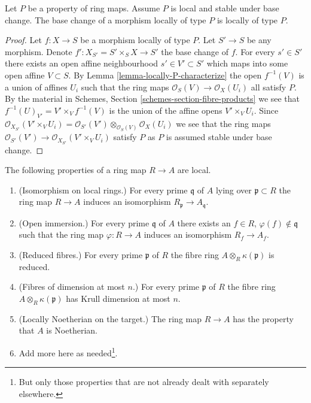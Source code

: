 \begin{lemma}
\label{lemma-base-change-type-P}
Let $P$ be a property of ring maps.
Assume $P$ is local and stable under base change.
The base change of a morphism locally of type $P$
is locally of type $P$.
\end{lemma}

\begin{proof}
Let $f : X \to S$ be a morphism locally of type $P$.
Let $S' \to S$ be any morphism. Denote
$f' : X_{S'} = S' \times_S X \to S'$ the base change of $f$.
For every $s' \in S'$ there exists an open affine neighbourhood
$s' \in V' \subset S'$ which maps into some open affine $V \subset S$.
By Lemma \ref{lemma-locally-P-characterize} the open $f^{-1}(V)$ is a
union of affines $U_i$ such that the ring maps
$\mathcal{O}_S(V) \to \mathcal{O}_X(U_i)$ all satisfy $P$.
By the material in Schemes, Section \ref{schemes-section-fibre-products}
we see that $f^{-1}(U)_{V'} = V' \times_V f^{-1}(V)$ is
the union of the affine opens $V' \times_V U_i$.
Since $\mathcal{O}_{X_{S'}}(V' \times_V U_i) =
\mathcal{O}_{S'}(V') \otimes_{\mathcal{O}_S(V)} \mathcal{O}_X(U_i)$
we see that the ring maps
$\mathcal{O}_{S'}(V') \to \mathcal{O}_{X_{S'}}(V' \times_V U_i)$
satisfy $P$ as $P$ is assumed stable under base change.
\end{proof}

\begin{lemma}
\label{lemma-properties-local}
The following properties of a ring map $R \to A$ are local.
\begin{enumerate}
\item (Isomorphism on local rings.)
For every prime $\mathfrak q$ of $A$ lying over $\mathfrak p \subset R$
the ring map $R \to A$ induces an isomorphism
$R_{\mathfrak p} \to A_{\mathfrak q}$.
\item (Open immersion.)
For every prime $\mathfrak q$ of $A$ there exists an $f \in R$,
$\varphi(f) \not \in \mathfrak q$ such that the ring map $\varphi : R \to A$
induces an isomorphism $R_f \to A_f$.
\item (Reduced fibres.)
For every prime $\mathfrak p$ of $R$ the fibre ring
$A \otimes_R \kappa(\mathfrak p)$ is reduced.
\item (Fibres of dimension at most $n$.)
For every prime $\mathfrak p$ of $R$ the fibre ring
$A \otimes_R \kappa(\mathfrak p)$ has Krull dimension at most $n$.
\item (Locally Noetherian on the target.)
The ring map $R \to A$ has the property that $A$ is Noetherian.
\item Add more here as needed\footnote{But only those properties
that are not already dealt with separately elsewhere.}.
\end{enumerate}
\end{lemma}

